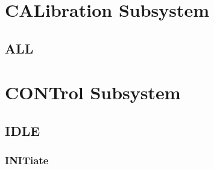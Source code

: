 \hypertarget{a00001_cal}{}\section{C\-A\-Libration Subsystem}\label{a00001_cal}
\hypertarget{a00001_calall}{}\subsection{A\-L\-L}\label{a00001_calall}
\hypertarget{a00001_ctrl}{}\section{C\-O\-N\-Trol Subsystem}\label{a00001_ctrl}
\hypertarget{a00001_ctrlidle}{}\subsection{I\-D\-L\-E}\label{a00001_ctrlidle}
\hypertarget{a00001_ctrlidleinit}{}\subsubsection{I\-N\-I\-Tiate}\label{a00001_ctrlidleinit}
